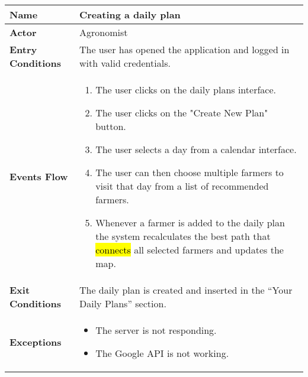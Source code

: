 
\begin{center}
\renewcommand{\arraystretch}{1.25}
\begin{tabular}{|l|>{\raggedright\arraybackslash}m{12cm}|}
    \hline
    \textbf{Name} & Creating a daily plan\\
    \hline
   	\textbf{Actor} & Agronomist\\
    \hline
    \textbf{Entry Conditions} & The user has opened the application and logged in with valid credentials.\\    
    \hline
    \textbf{Events Flow} & \begin{enumerate}
            \item The user clicks on the daily plans interface.
            \item The user clicks on the "Create New Plan" button.
            \item The user selects a day from a calendar interface.
            \item The user can then choose multiple farmers to visit that day from a list of recommended farmers.
            \item Whenever a farmer is added to the daily plan the system recalculates the best path that \hl{connects} all selected farmers and updates the map.
       \end{enumerate} \\
    \hline
    \textbf{Exit Conditions} & The daily plan is created and inserted in the “Your Daily Plans” section.\\
    \hline
    \textbf{Exceptions} &
      \begin{itemize}
          \item The server is not responding.%
          \item The Google API is not working.%
        \end{itemize}
 \\
    \hline
\end{tabular}
\end{center}